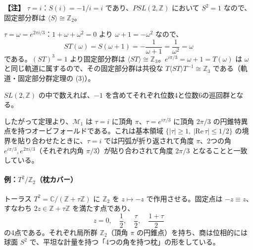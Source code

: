 \documentclass[uplatex, dvipdfmx, book]{jsbook}
\newenvironment{note}{\vspace{1ex}\par\footnotesize\noindent\textbf{【注】}}{\par\vspace{1ex}}
\begin{document}
\begin{note}
$\tau = i$：$S(i) = -1/i = i$ であり、$PSL(2, \mathbb{Z})$ において $S^2 = 1$ なので、固定部分群は $\langle S \rangle \cong \mathbb{Z}_2$。

$\tau = \omega = e^{2\pi i/3}$：$1 + \omega + \omega^2 = 0$ より $\omega + 1 = -\omega^2$ なので、
\begin{equation*}
    ST(\omega) = S(\omega + 1) = -\frac{1}{\omega + 1} = \frac{1}{\omega^2} = \omega
\end{equation*}
である。$(ST)^3 = 1$ より固定部分群は $\langle ST \rangle \cong \mathbb{Z}_3$。$e^{i\pi/3} = \omega + 1 = T(\omega)$ は $\omega$ と同じ軌道に属するので、その固定部分群は共役な $T \langle ST \rangle T^{-1} \cong \mathbb{Z}_3$ である（軌道・固定部分群定理の (3)）。

$SL(2, \mathbb{Z})$ の中で数えれば、$-1$ を含めてそれぞれ位数4と位数6の巡回群となる。
\end{note}

したがって定理より、$\mathcal{M}_1$ は $\tau = i$ に頂角 $\pi$、$\tau = e^{i\pi/3}$ に頂角 $2\pi/3$ の円錐特異点を持つオービフォールドである。これは基本領域 $\{|\tau| \ge 1,\ |\mathrm{Re}\,\tau| \le 1/2\}$ の境界を貼り合わせたときに、$\tau = i$ では円弧が折り返されて角度 $\pi$、2つの角 $e^{i\pi/3}, e^{2\pi i/3}$（それぞれ内角 $\pi/3$）が貼り合わされて角度 $2\pi/3$ となることと一致している。

\paragraph{例：$T^2/\mathbb{Z}_2$（枕カバー）}
トーラス $T^2 = \mathbb{C}/(\mathbb{Z} + \tau\mathbb{Z})$ に $\mathbb{Z}_2$ を $z \mapsto -z$ で作用させる。固定点は $-z \equiv z$、すなわち $2z \in \mathbb{Z} + \tau\mathbb{Z}$ を満たす点であり、
\begin{equation}
    z = 0,\quad \frac{1}{2},\quad \frac{\tau}{2},\quad \frac{1 + \tau}{2}
\end{equation}
の4点である。それぞれ局所群 $\mathbb{Z}_2$（頂角 $\pi$ の円錐点）を持ち、商は位相的には球面 $S^2$ で、平坦な計量を持つ「4つの角を持つ枕」の形をしている。
\end{document}
